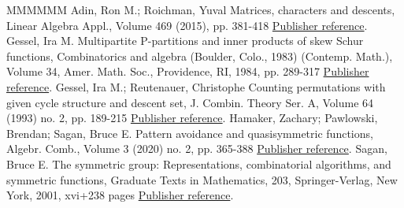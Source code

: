 \begin{thebibliography}{MMMMMM}
 Adin, Ron M.; Roichman, Yuval Matrices, characters and descents, Linear Algebra Appl., Volume 469 (2015), pp. 381-418 \href{https://alco.centre-mersenne.org/articles/10.5802/alco.351/#adin_roichman_fine_set}{Publisher reference}.
 Gessel, Ira M. Multipartite P-partitions and inner products of skew Schur functions, Combinatorics and algebra (Boulder, Colo., 1983) (Contemp. Math.), Volume 34, Amer. Math. Soc., Providence, RI, 1984, pp. 289-317 \href{https://alco.centre-mersenne.org/articles/10.5802/alco.351/#knuth_classes_schur_positive}{Publisher reference}.
 Gessel, Ira M.; Reutenauer, Christophe Counting permutations with given cycle structure and descent set, J. Combin. Theory Ser. A, Volume 64 (1993) no. 2, pp. 189-215 \href{https://alco.centre-mersenne.org/articles/10.5802/alco.351/#gessel1993counting}{Publisher reference}.
 Hamaker, Zachary; Pawlowski, Brendan; Sagan, Bruce E. Pattern avoidance and quasisymmetric functions, Algebr. Comb., Volume 3 (2020) no. 2, pp. 365-388 \href{https://alco.centre-mersenne.org/articles/10.5802/alco.351/#S3_patterns_list}{Publisher reference}.
 Sagan, Bruce E. The symmetric group: Representations, combinatorial algorithms, and symmetric functions, Graduate Texts in Mathematics, 203, Springer-Verlag, New York, 2001, xvi+238 pages \href{https://alco.centre-mersenne.org/articles/10.5802/alco.351/#sagan_book}{Publisher reference}.
\end{thebibliography}
